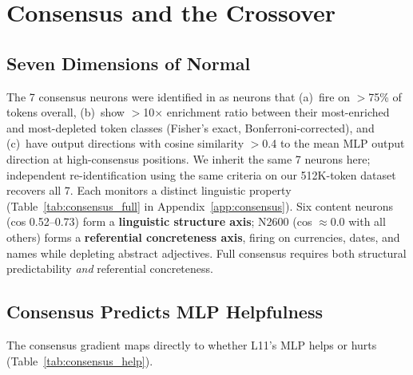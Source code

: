 \documentclass{article}
\begin{document}
\section{Consensus and the Crossover}
\label{sec:consensus}

\subsection{Seven Dimensions of Normal}

The 7 consensus neurons were identified in \citet{balogh2026discrete}
as neurons that (a)~fire on $>$75\% of tokens overall,
(b)~show $>$10$\times$ enrichment ratio between their most-enriched
and most-depleted token classes (Fisher's exact, Bonferroni-corrected),
and (c)~have output directions with cosine similarity $>$0.4
to the mean MLP output direction at high-consensus positions.
We inherit the same 7 neurons here; independent re-identification
using the same criteria on our 512K-token dataset recovers all 7.
Each monitors a distinct linguistic property
(Table~\ref{tab:consensus_full} in Appendix~\ref{app:consensus}).
Six content neurons (cos 0.52--0.73) form a \textbf{linguistic structure axis};
N2600 (cos $\approx 0.0$ with all others) forms a \textbf{referential
concreteness axis}, firing on currencies, dates, and names while depleting
abstract adjectives.
Full consensus requires both structural predictability \emph{and} referential
concreteness.

\subsection{Consensus Predicts MLP Helpfulness}

The consensus gradient maps directly to whether L11's MLP helps or hurts
(Table~\ref{tab:consensus_help}).
\end{document}
